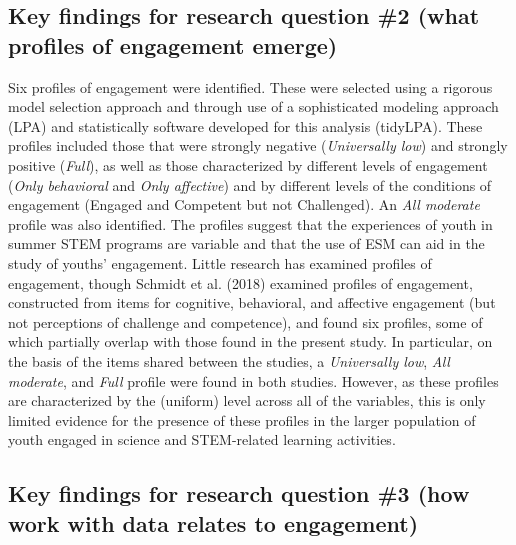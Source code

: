 \documentclass[]{msu-thesis}
\theoremstyle{definition}
\theoremstyle{definition}
\theoremstyle{definition}
\theoremstyle{remark}
\begin{document}
\subsection{Key findings for research question \#2 (what profiles of
engagement
emerge)}\label{key-findings-for-research-question-2-what-profiles-of-engagement-emerge}

Six profiles of engagement were identified. These were selected using a
rigorous model selection approach and through use of a sophisticated
modeling approach (LPA) and statistically software developed for this
analysis (tidyLPA). These profiles included those that were strongly
negative (\emph{Universally low}) and strongly positive (\emph{Full}),
as well as those characterized by different levels of engagement
(\emph{Only behavioral} and \emph{Only affective}) and by different
levels of the conditions of engagement (Engaged and Competent but not
Challenged). An \emph{All moderate} profile was also identified. The
profiles suggest that the experiences of youth in summer STEM programs
are variable and that the use of ESM can aid in the study of youths'
engagement. Little research has examined profiles of engagement, though
Schmidt et al. (2018) examined profiles of engagement, constructed from
items for cognitive, behavioral, and affective engagement (but not
perceptions of challenge and competence), and found six profiles, some
of which partially overlap with those found in the present study. In
particular, on the basis of the items shared between the studies, a
\emph{Universally low}, \emph{All moderate}, and \emph{Full} profile
were found in both studies. However, as these profiles are characterized
by the (uniform) level across all of the variables, this is only limited
evidence for the presence of these profiles in the larger population of
youth engaged in science and STEM-related learning activities.

\subsection{Key findings for research question \#3 (how work with data
relates to
engagement)}\label{key-findings-for-research-question-3-how-work-with-data-relates-to-engagement}
\end{document}
